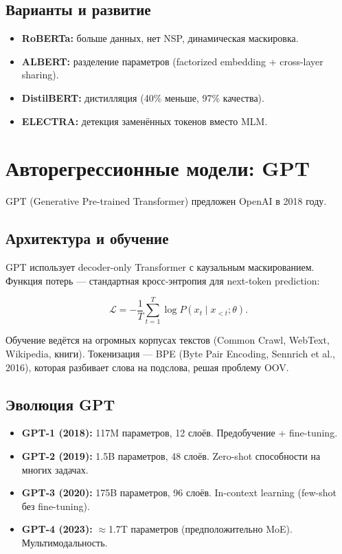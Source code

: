 \documentclass[a4paper,12pt]{article}
\begin{document}
\subsection{Варианты и развитие}
\begin{itemize}
    \item \textbf{RoBERTa:} больше данных, нет NSP, динамическая маскировка.
    \item \textbf{ALBERT:} разделение параметров (factorized embedding + cross-layer sharing).
    \item \textbf{DistilBERT:} дистилляция (40\% меньше, 97\% качества).
    \item \textbf{ELECTRA:} детекция заменённых токенов вместо MLM.
\end{itemize}

\section{Авторегрессионные модели: GPT}

GPT (Generative Pre-trained Transformer) предложен OpenAI в 2018 году.

\subsection{Архитектура и обучение}

GPT использует decoder-only Transformer с каузальным маскированием. Функция потерь --- стандартная кросс-энтропия для next-token prediction:

\[
\mathcal{L} = -\frac{1}{T} \sum_{t=1}^T \log P(x_t \mid x_{<t}; \theta).
\]

Обучение ведётся на огромных корпусах текстов (Common Crawl, WebText, Wikipedia, книги). Токенизация --- BPE (Byte Pair Encoding, Sennrich et al., 2016), которая разбивает слова на подслова, решая проблему OOV.

\subsection{Эволюция GPT}

\begin{itemize}
    \item \textbf{GPT-1 (2018):} 117M параметров, 12 слоёв. Предобучение + fine-tuning.
    \item \textbf{GPT-2 (2019):} 1.5B параметров, 48 слоёв. Zero-shot способности на многих задачах.
    \item \textbf{GPT-3 (2020):} 175B параметров, 96 слоёв. In-context learning (few-shot без fine-tuning).
    \item \textbf{GPT-4 (2023):} $\approx$1.7T параметров (предположительно MoE). Мультимодальность.
\end{itemize}
\end{document}
